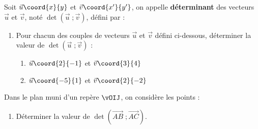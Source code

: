 \begin{exo}{}
	Soit $\vec{u}\coord{x}{y}$ et $\vec{v}\coord{x^\prime}{y^\prime}$, on appelle \textbf{déterminant} des vecteurs $\vec{u}$ et $\vec{v}$, noté $\det(\vec{u}\;; \vec{v})$, défini par : 

	\begin{enumerate}
		\item Pour chacun des couples de vecteurs $\vec{u}$ et $\vec{v}$ défini ci-dessous, déterminer la valeur de $\det(\vec{u}\;; \vec{v})$ :
		      \begin{enumerate}
			      \item $\vec{u}\coord{2}{-1}$ et $\vec{v}\coord{3}{4}$
			      \item $\vec{u}\coord{-5}{1}$ et $\vec{v}\coord{2}{-2}$
		      \end{enumerate}
	\end{enumerate}
	Dans le plan muni d'un repère $\vOIJ$, on considère les points : 
	\begin{enumerate}[resume]
		\item Déterminer la valeur de $\det(\vec{AB}\;; \vec{AC})$.
	\end{enumerate}
\end{exo}

